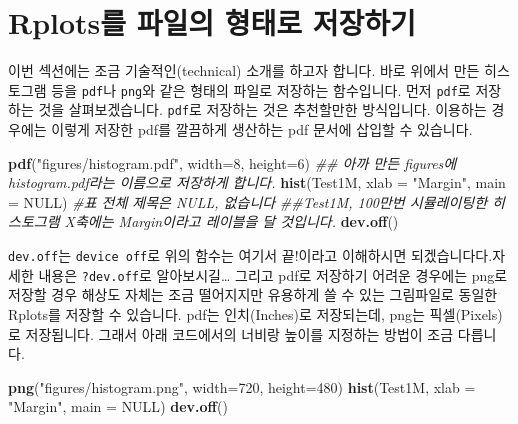 \documentclass[]{book}
\newenvironment{Shaded}{\begin{snugshade}}{\end{snugshade}}
\newcommand{\CommentTok}[1]{\textcolor[rgb]{0.56,0.35,0.01}{\textit{#1}}}
\newcommand{\DataTypeTok}[1]{\textcolor[rgb]{0.13,0.29,0.53}{#1}}
\newcommand{\DecValTok}[1]{\textcolor[rgb]{0.00,0.00,0.81}{#1}}
\newcommand{\KeywordTok}[1]{\textcolor[rgb]{0.13,0.29,0.53}{\textbf{#1}}}
\newcommand{\NormalTok}[1]{#1}
\newcommand{\OtherTok}[1]{\textcolor[rgb]{0.56,0.35,0.01}{#1}}
\newcommand{\StringTok}[1]{\textcolor[rgb]{0.31,0.60,0.02}{#1}}
\begin{document}
\hypertarget{rplotsuxb97c-uxd30cuxc77cuxc758-uxd615uxd0dcuxb85c-uxc800uxc7a5uxd558uxae30}{%
\section{Rplots를 파일의 형태로 저장하기}\label{rplotsuxb97c-uxd30cuxc77cuxc758-uxd615uxd0dcuxb85c-uxc800uxc7a5uxd558uxae30}}

이번 섹션에는 조금 기술적인(technical) 소개를 하고자 합니다. 바로 위에서 만든 히스토그램 등을 \texttt{pdf}나 \texttt{png}와 같은 형태의 파일로 저장하는 함수입니다. 먼저 \texttt{pdf}로 저장하는 것을 살펴보겠습니다. \texttt{pdf}로 저장하는 것은 추천할만한 방식입니다.  이용하는 경우에는 이렇게 저장한 pdf를 깔끔하게  생산하는 pdf 문서에 삽입할 수 있습니다.

\begin{Shaded}
\begin{Highlighting}[]
\KeywordTok{pdf}\NormalTok{(}\StringTok{"figures/histogram.pdf"}\NormalTok{, }\DataTypeTok{width=}\DecValTok{8}\NormalTok{, }\DataTypeTok{height=}\DecValTok{6}\NormalTok{) }
\CommentTok{## 아까 만든 figures에 histogram.pdf라는 이름으로 저장하게 합니다.}
\KeywordTok{hist}\NormalTok{(Test1M, }\DataTypeTok{xlab =} \StringTok{"Margin"}\NormalTok{, }\DataTypeTok{main =} \OtherTok{NULL}\NormalTok{)  }\CommentTok{#표 전체 제목은 NULL, 없습니다}
\CommentTok{##Test1M, 100만번 시뮬레이팅한 히스토그램 X축에는 Margin이라고 레이블을 달 것입니다.}
\KeywordTok{dev.off}\NormalTok{()}
\end{Highlighting}
\end{Shaded}

\texttt{dev.off}는 \texttt{device\ off}로 위의 함수는 여기서 끝!이라고 이해하시면 되겠습니다다.자세한 내용은 \texttt{?dev.off}로 알아보시길\ldots{} 그리고 pdf로 저장하기 어려운 경우에는 png로 저장할 경우 해상도 자체는 조금 떨어지지만 유용하게 쓸 수 있는 그림파일로 동일한 Rplots를 저장할 수 있습니다. pdf는 인치(Inches)로 저장되는데, png는 픽셀(Pixels)로 저장됩니다. 그래서 아래 코드에서의 너비랑 높이를 지정하는 방법이 조금 다릅니다.

\begin{Shaded}
\begin{Highlighting}[]
\KeywordTok{png}\NormalTok{(}\StringTok{"figures/histogram.png"}\NormalTok{, }\DataTypeTok{width=}\DecValTok{720}\NormalTok{, }\DataTypeTok{height=}\DecValTok{480}\NormalTok{)}
\KeywordTok{hist}\NormalTok{(Test1M, }\DataTypeTok{xlab =} \StringTok{"Margin"}\NormalTok{, }\DataTypeTok{main =} \OtherTok{NULL}\NormalTok{)}
\KeywordTok{dev.off}\NormalTok{()}
\end{Highlighting}
\end{Shaded}
\end{document}
